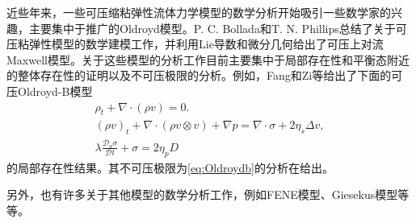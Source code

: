 近些年来，一些可压缩粘弹性流体力学模型的数学分析开始吸引一些数学家的兴趣，主要集中于推广的Oldroyd模型。P. C. Bollada和T. N. Phillips总结了关于可压粘弹性模型的数学建模工作\cite{bollada2012mathematical}，并利用Lie导数和微分几何给出了可压上对流Maxwell模型。关于这些模型的分析工作目前主要集中于局部存在性和平衡态附近的整体存在性的证明以及不可压极限的分析\cite{zhang2012global,fang2013strong,fang2014incompressible,matuvsuu1999existence,fang2013strong,barrett2016existence,salloum2011local}。例如，Fang和Zi等\cite{fang2013strong}给出了下面的可压Oldroyd-B模型
\begin{subequations}
	\begin{align*}
	\rho_t + \nabla \cdot (\rho v) = 0. \\
	(\rho v)_t + \nabla \cdot (\rho v \otimes v)  + \nabla p = \nabla \cdot \sigma + 2 \eta_s \Delta v, \\
	\lambda \frac{\mathcal{D}_a \sigma}{\mathcal{D} t} + \sigma = 2 \eta_p D
	\end{align*}
\end{subequations}
的局部存在性结果。其不可压极限为\eqref{eq:Oldroydb}的分析在\cite{fang2014incompressible}给出。

另外，也有许多关于其他模型的数学分析工作，例如FENE模型\cite{masmoudi2008well,zhang2006local,jourdain2004existence,liu2008boundary}、Giesekus模型\cite{renardy1984existence}等等。

